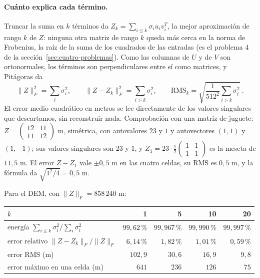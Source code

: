 \paragraph{Cuánto explica cada término.} Truncar la suma en \(k\) términos da
\(Z_k=\sum_{i\le k}\sigma_iu_iv_i^T\), la mejor aproximación de rango \(k\) de \(Z\): ninguna
otra matriz de rango \(k\) queda más cerca en la norma de Frobenius, la raíz de la suma de los
cuadrados de las entradas (es el problema 4 de la sección~\ref{sec:cuatro-problemas}). Como
las columnas de \(U\) y de \(V\) son ortonormales, los términos son perpendiculares entre sí
como matrices, y Pitágoras da
\[
  \|Z\|_F^2=\sum_{i}\sigma_i^2,\qquad
  \|Z-Z_k\|_F^2=\sum_{i>k}\sigma_i^2,\qquad
  \mathrm{RMS}_k=\sqrt{\frac{1}{512^2}\sum_{i>k}\sigma_i^2}\ .
\]
El error medio cuadrático en metros se lee directamente de los valores singulares que
descartamos, sin reconstruir nada. Comprobación con una matriz de juguete:
\(Z=\begin{pmatrix}12&11\\11&12\end{pmatrix}\) m, simétrica, con autovalores \(23\) y \(1\)
y autovectores \((1,1)\) y \((1,-1)\); sus valores singulares son \(23\) y \(1\), y
\(Z_1=23\cdot\tfrac12\begin{pmatrix}1&1\\1&1\end{pmatrix}\) es la meseta de \(11{,}5\) m. El
error \(Z-Z_1\) vale \(\pm0{,}5\) m en las cuatro celdas, su RMS es \(0{,}5\) m, y la fórmula
da \(\sqrt{1^2/4}=0{,}5\) m.

Para el DEM, con \(\|Z\|_F=858\,240\) m:

{\small
\begin{center}
\begin{tabular}{l rrrr}
\toprule
\(k\) & 1 & 5 & 10 & 20\\
\midrule
energía \(\sum_{i\le k}\sigma_i^2/\sum_i\sigma_i^2\) & \(99{,}62\)\,\% & \(99{,}967\)\,\% & \(99{,}990\)\,\% & \(99{,}997\)\,\%\\
error relativo \(\|Z-Z_k\|_F/\|Z\|_F\) & \(6{,}14\)\,\% & \(1{,}82\)\,\% & \(1{,}01\)\,\% & \(0{,}59\)\,\%\\
error RMS (m) & \(102{,}9\) & \(30{,}6\) & \(16{,}9\) & \(9{,}8\)\\
error máximo en una celda (m) & \(641\) & \(236\) & \(126\) & \(75\)\\
\bottomrule
\end{tabular}
\end{center}
}


